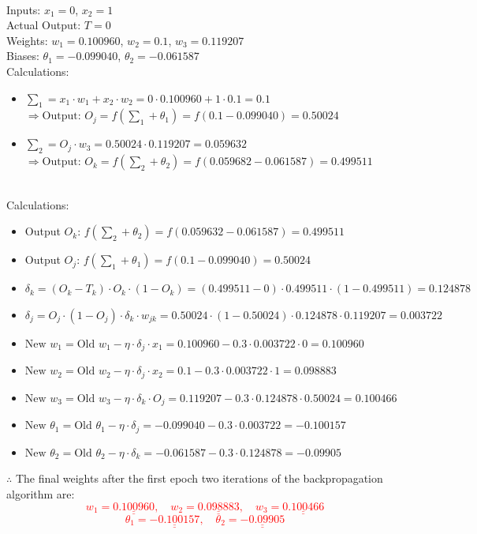 \documentclass{book}
\begin{document}
\\
Inputs: \(x_1 = 0\), \(x_2 = 1\)\\
Actual Output: \(T = 0\)\\
Weights: \(w_1 = 0.100960\), \(w_2 = 0.1\), \(w_3 = 0.119207\)\\
Biases: \(\theta_1 = -0.099040\), \(\theta_2 = -0.061587\)\\
Calculations:
\begin{itemize}
    \item \(\sum_1 = x_1 \cdot w_1 + x_2 \cdot w_2 = 0 \cdot 0.100960 + 1 \cdot 0.1 = 0.1\)\\
    \(\Rightarrow \text{Output: }O_j = f(\sum_1 + \theta_1) = f(0.1 - 0.099040) = 0.50024\)
    \item \(\sum_2 = O_j \cdot w_3 = 0.50024 \cdot 0.119207 = 0.059632\)\\
    \(\Rightarrow \text{Output: }O_k = f(\sum_2 + \theta_2) = f(0.059682 - 0.061587) = 0.499511\)
\end{itemize}
\\
Calculations:
\begin{itemize}
    \item Output \(O_k\): \(f(\sum_2 + \theta_2) = f(0.059632 - 0.061587) = 0.499511\)
    \item Output \(O_j\): \(f(\sum_1 + \theta_1) = f(0.1 - 0.099040) = 0.50024\)
    \item \(\delta_k = (O_k - T_k) \cdot O_k \cdot (1 - O_k) = (0.499511 - 0) \cdot 0.499511 \cdot (1 - 0.499511) = 0.124878\)
    \item \(\delta_j = O_j \cdot (1 - O_j) \cdot \delta_k \cdot w_{jk} = 0.50024 \cdot (1 - 0.50024) \cdot 0.124878 \cdot 0.119207 = 0.003722\)
    \item \(\text{New } w_1 = \text{Old } w_1 - \eta \cdot \delta_j \cdot x_1 = 0.100960 - 0.3 \cdot 0.003722 \cdot 0 = 0.100960\)
    \item \(\text{New } w_2 = \text{Old } w_2 - \eta \cdot \delta_j \cdot x_2 = 0.1 - 0.3 \cdot 0.003722 \cdot 1 = 0.098883\)
    \item \(\text{New } w_3 = \text{Old } w_3 - \eta \cdot \delta_k \cdot O_j = 0.119207 - 0.3 \cdot 0.124878 \cdot 0.50024 = 0.100466\)
    \item \(\text{New } \theta_1 = \text{Old } \theta_1 - \eta \cdot \delta_j = -0.099040 - 0.3 \cdot 0.003722 = -0.100157\)
    \item \(\text{New } \theta_2 = \text{Old } \theta_2 - \eta \cdot \delta_k = -0.061587 - 0.3 \cdot 0.124878 = -0.09905\)
\end{itemize}
\vspace{3mm}
$\therefore$ The final weights after the first epoch two iterations of the backpropagation algorithm are:
\textcolor{red}{
\[
    w_1 = \underline{\underline{0.100960}}, \quad w_2 = \underline{\underline{0.098883}}, \quad w_3 = \underline{\underline{0.100466}}
\]
\[
    \theta_1 = \underline{\underline{-0.100157}}, \quad \theta_2 = \underline{\underline{-0.09905}}
\]
}
\newpage
\end{document}
